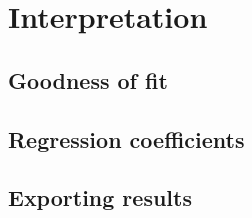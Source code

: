 %
%
%
\section{Interpretation}

	\subsection{Goodness of fit}

	\subsection{Regression coefficients}
  

	\subsection{Exporting results}

